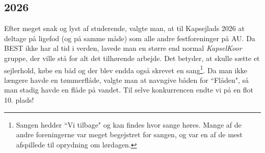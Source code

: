 \subsection{2026}
Efter meget snak og lyst af \TKETs studerende, valgte man, at til Kapsejlads 2026 at deltage på ligefod (og på samme måde) som alle andre festforeninger på AU. Da BEST ikke har al tid i verden, lavede man en større end normal \textit{KapselKoor} gruppe, der ville stå for alt det tilhørende arbejde. Det betyder, at \TKET skulle sætte et sejlerhold, købe en båd og der blev endda også skrevet en sang\footnote{Sangen hedder ``Vi tilbage" og kan findes hvor sange høres. Mange af de andre foreningerne var meget begejstret for sangen, og var en af de mest afspillede til oprydning om lørdagen.}. Da man ikke længere havde en tømmerflåde, valgte man at navngive båden for ``Flåden", så man stadig havde en flåde på vandet. Til selve konkurrencen endte vi på en flot 10. plads!